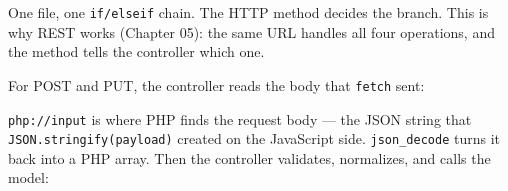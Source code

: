 \documentclass[11pt,a4paper,oneside]{book}
\newenvironment{Shaded}{\begin{snugshade}}{\end{snugshade}}
\newcommand{\KeywordTok}[1]{\textcolor[HTML]{007020}{\textbf{#1}}}
\newcommand{\StringTok}[1]{\textcolor[HTML]{4070A0}{#1}}
\newcommand{\CommentTok}[1]{\textcolor[HTML]{60A0B0}{\textit{#1}}}
\newcommand{\OtherTok}[1]{\textcolor[HTML]{007020}{#1}}
\newcommand{\FunctionTok}[1]{\textcolor[HTML]{06287E}{#1}}
\newcommand{\VariableTok}[1]{\textcolor[HTML]{19177C}{#1}}
\newcommand{\ControlFlowTok}[1]{\textcolor[HTML]{007020}{\textbf{#1}}}
\newcommand{\OperatorTok}[1]{\textcolor[HTML]{666666}{#1}}
\newcommand{\NormalTok}[1]{#1}
\begin{document}
\begin{Shaded}
\end{Shaded}

One file, one \texttt{if/elseif} chain. The HTTP method decides
the branch. This is why REST works (Chapter 05): the same URL
handles all four operations, and the method tells the controller
which one.

For POST and PUT, the controller reads the body that
\texttt{fetch} sent:

\begin{Shaded}
\end{Shaded}

\texttt{php://input} is where PHP finds the request body --- the
JSON string that \texttt{JSON.stringify(payload)} created on the
JavaScript side. \texttt{json\_decode} turns it back into a PHP
array. Then the controller validates, normalizes, and calls the
model:
\end{document}
